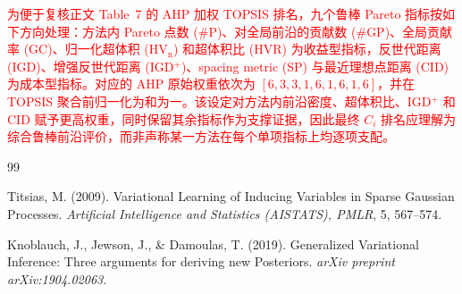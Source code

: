 \documentclass[11pt]{article}
\begin{document}
	\textcolor{red}{为便于复核正文 Table~7 的 AHP 加权 TOPSIS 排名，九个鲁棒 Pareto 指标按如下方向处理：方法内 Pareto 点数 (\#P)、对全局前沿的贡献数 (\#GP)、全局贡献率 (GC)、归一化超体积 ($\mathrm{HV}_{\mathrm{n}}$) 和超体积比 (HVR) 为收益型指标，反世代距离 (IGD)、增强反世代距离 (IGD$^{+}$)、spacing metric (SP) 与最近理想点距离 (CID) 为成本型指标。对应的 AHP 原始权重依次为 $[6,3,3,1,6,1,6,1,6]$，并在 TOPSIS 聚合前归一化为和为一。该设定对方法内前沿密度、超体积比、IGD$^{+}$ 和 CID 赋予更高权重，同时保留其余指标作为支撑证据，因此最终 $C_i$ 排名应理解为综合鲁棒前沿评价，而非声称某一方法在每个单项指标上均逐项支配。}%

	\newpage
\begin{thebibliography}{99}

	Titsias, M. (2009).
	Variational Learning of Inducing Variables in Sparse Gaussian Processes.
	\textit{Artificial Intelligence and Statistics (AISTATS), PMLR}, 5, 567--574.

	Knoblauch, J., Jewson, J., \& Damoulas, T. (2019).
	Generalized Variational Inference: Three arguments for deriving new Posteriors.
	\textit{arXiv preprint arXiv:1904.02063}.

\end{thebibliography}
\end{document}
